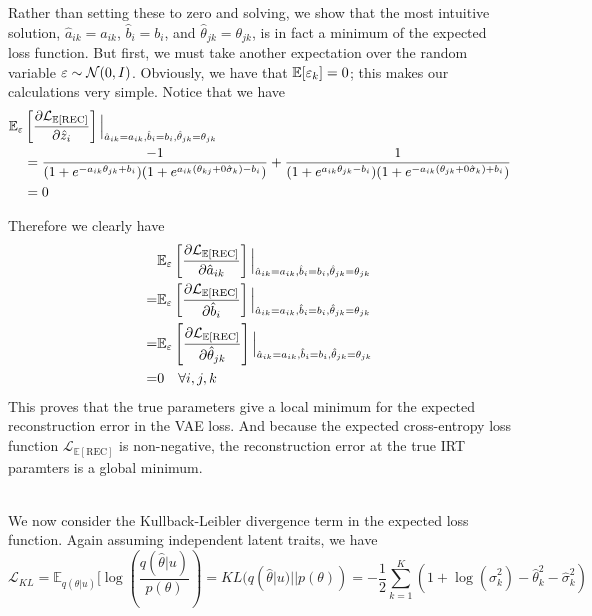 \documentclass[letterpaper]{article}
\def \e{\ensuremath \varepsilon}
\theoremstyle{definition}
\begin{document}
Rather than setting these to zero and solving, we show that the most intuitive solution, $\hat a_{ik} = a_{ik}$, $\hat b_i = b_i$, and $\hat \theta_{jk} = \theta_{jk}$, is in fact a minimum of the expected loss function. But first, we must take another expectation over the random variable $\e \sim \mathcal{N}(0,I)$. Obviously, we have that $\mathbb{E}[\e_k] = 0$; this makes our calculations very simple. Notice that we have
\begin{equation}
  \begin{split}
  \mathbb{E}_\e &\left[\frac{\partial \mathcal{L}_{\mathbb{E}[\text{REC}]}}{\partial \hat z_i}\right] \Big|_{\hat a_{ik} = a_{ik}, \hat b_i = b_i, \hat \theta_{jk} = \theta_{jk}} \\
  &= \frac{-1}{(1 + e^{-a_{ik}\theta_{jk} + b_i})(1 + e^{a_{ik} (\theta_{kj} + 0 \hat \sigma_k) - b_i})} + \frac{1}{(1 + e^{a_{ik}\theta_{jk} - b_i})(1 + e^{-a_{ik}(\theta_{jk} + 0 \hat \sigma_k) + b_i})} \\
  &= 0
\end{split}
\end{equation}

Therefore we clearly have 
\begin{equation}
  \begin{split}
  &\mathbb{E}_\e \left[\frac{\partial \mathcal{L}_{\mathbb{E}[\text{REC}]}}{\partial \hat a_{ik}}\right] \Big|_{\hat a_{ik} = a_{ik}, \hat b_i = b_i, \hat \theta_{jk} = \theta_{jk}} \\
  = &\mathbb{E}_\e \left[\frac{\partial \mathcal{L}_{\mathbb{E}[\text{REC}]}}{\partial \hat b_i}\right] \Big|_{\hat a_{ik} = a_{ik}, \hat b_i = b_i, \hat \theta_{jk} = \theta_{jk}} \\
  = &\mathbb{E}_\e \left[\frac{\partial \mathcal{L}_{\mathbb{E}[\text{REC}]}}{\partial \hat \theta_{jk}}\right] \Big|_{\hat a_{ik} = a_{ik}, \hat b_i = b_i, \hat \theta_{jk} = \theta_{jk}} \\
  = &0 \quad \forall i,j,k
\end{split}
  \label{solve}
\end{equation}
This proves that the true parameters give a local minimum for the expected reconstruction error in the VAE loss. And because the expected cross-entropy loss function $\mathcal{L}_{\mathbb{E}[\text{REC}]}$ is non-negative, the reconstruction error at the true IRT paramters is a global minimum. 

\\

We now consider the Kullback-Leibler divergence term in the expected loss function. Again assuming independent latent traits, we have
\begin{equation}
  \mathcal{L}_{KL} = \mathbb{E}_{q(\theta | u)}[\log \left( \frac{q(\hat \theta | u)}{p(\theta)} \right) = KL(q(\hat \theta |u) || p(\theta)) = -\frac{1}{2} \sum_{k=1}^K (1 + \log(\hat \sigma_k^2) - \hat \theta_k^2 - \hat \sigma_k^2)
  \label{eq:kl}
\end{equation}
\end{document}
